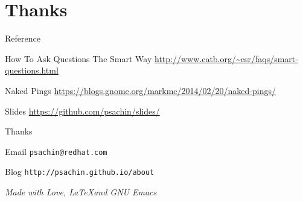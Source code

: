 \documentclass[10pt]{beamer}
\begin{document}
\section{Thanks}
\label{sec:org45a4951}
\begin{frame}[label={sec:org95afdcd}]{Reference}
\begin{block}{How To Ask Questions The Smart Way}
\url{http://www.catb.org/\~esr/faqs/smart-questions.html}
\end{block}

\begin{block}{Naked Pings}
\url{https://blogs.gnome.org/markmc/2014/02/20/naked-pings/}
\end{block}

\begin{block}{Slides}
\url{https://github.com/psachin/slides/}
\end{block}
\end{frame}

\begin{frame}[fragile,label={sec:orgb879fdc}]{Thanks}
 \begin{block}{Email}
\texttt{psachin@redhat.com}
\end{block}
\begin{block}{Blog}
\texttt{http://psachin.github.io/about}
\end{block}


\begin{block}{}
\emph{Made with Love, \LaTeX and GNU Emacs}
\end{block}
\end{frame}
\end{document}
